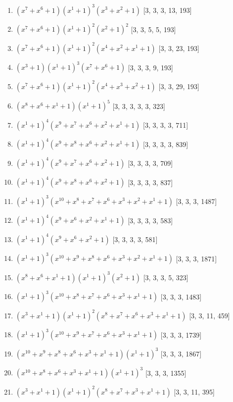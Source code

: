 \documentclass[10pt,twocolumn]{article}
\begin{document}
\begin{enumerate}
\item $(x^{7} + x^{6} + 1)(x^{1} + 1)^{3}(x^{3} + x^{2} + 1)$  [3, 3, 3, 13, 193]
\item $(x^{7} + x^{6} + 1)(x^{1} + 1)^{2}(x^{2} + 1)^{2}$  [3, 3, 5, 5, 193]
\item $(x^{7} + x^{6} + 1)(x^{1} + 1)^{2}(x^{4} + x^{2} + x^{1} + 1)$  [3, 3, 23, 193]
\item $(x^{3} + 1)(x^{1} + 1)^{3}(x^{7} + x^{6} + 1)$  [3, 3, 3, 9, 193]
\item $(x^{7} + x^{6} + 1)(x^{1} + 1)^{2}(x^{4} + x^{3} + x^{2} + 1)$  [3, 3, 29, 193]
\item $(x^{8} + x^{6} + x^{1} + 1)(x^{1} + 1)^{5}$  [3, 3, 3, 3, 3, 323]
\item $(x^{1} + 1)^{4}(x^{9} + x^{7} + x^{6} + x^{2} + x^{1} + 1)$  [3, 3, 3, 3, 711]
\item $(x^{1} + 1)^{4}(x^{9} + x^{8} + x^{6} + x^{2} + x^{1} + 1)$  [3, 3, 3, 3, 839]
\item $(x^{1} + 1)^{4}(x^{9} + x^{7} + x^{6} + x^{2} + 1)$  [3, 3, 3, 3, 709]
\item $(x^{1} + 1)^{4}(x^{9} + x^{8} + x^{6} + x^{2} + 1)$  [3, 3, 3, 3, 837]
\item $(x^{1} + 1)^{3}(x^{10} + x^{8} + x^{7} + x^{6} + x^{3} + x^{2} + x^{1} + 1)$  [3, 3, 3, 1487]
\item $(x^{1} + 1)^{4}(x^{9} + x^{6} + x^{2} + x^{1} + 1)$  [3, 3, 3, 3, 583]
\item $(x^{1} + 1)^{4}(x^{9} + x^{6} + x^{2} + 1)$  [3, 3, 3, 3, 581]
\item $(x^{1} + 1)^{3}(x^{10} + x^{9} + x^{8} + x^{6} + x^{3} + x^{2} + x^{1} + 1)$  [3, 3, 3, 1871]
\item $(x^{8} + x^{6} + x^{1} + 1)(x^{1} + 1)^{3}(x^{2} + 1)$  [3, 3, 3, 5, 323]
\item $(x^{1} + 1)^{3}(x^{10} + x^{8} + x^{7} + x^{6} + x^{3} + x^{1} + 1)$  [3, 3, 3, 1483]
\item $(x^{3} + x^{1} + 1)(x^{1} + 1)^{2}(x^{8} + x^{7} + x^{6} + x^{3} + x^{1} + 1)$  [3, 3, 11, 459]
\item $(x^{1} + 1)^{3}(x^{10} + x^{9} + x^{7} + x^{6} + x^{3} + x^{1} + 1)$  [3, 3, 3, 1739]
\item $(x^{10} + x^{9} + x^{8} + x^{6} + x^{3} + x^{1} + 1)(x^{1} + 1)^{3}$  [3, 3, 3, 1867]
\item $(x^{10} + x^{8} + x^{6} + x^{3} + x^{1} + 1)(x^{1} + 1)^{3}$  [3, 3, 3, 1355]
\item $(x^{3} + x^{1} + 1)(x^{1} + 1)^{2}(x^{8} + x^{7} + x^{3} + x^{1} + 1)$  [3, 3, 11, 395]

\end{enumerate}
\end{document}
